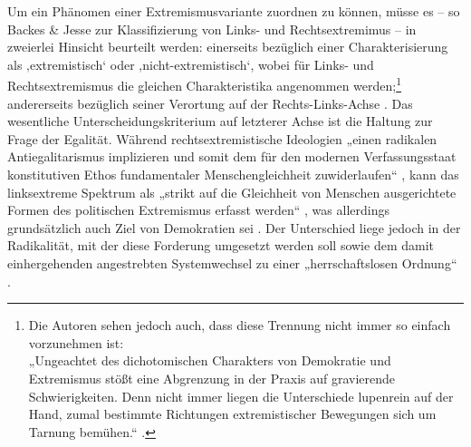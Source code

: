Um ein Phänomen einer Extremismusvariante zuordnen zu können, müsse es -- so Backes \& Jesse zur Klassifizierung von Links- und Rechtsextremimus -- in zweierlei Hinsicht beurteilt werden: einerseits bezüglich einer Charakterisierung als ‚extremistisch` oder ‚nicht-extremistisch`, wobei für Links- und Rechtsextremismus die gleichen Charakteristika angenommen werden;\footnote{Die Autoren sehen jedoch auch, dass diese Trennung nicht immer so einfach vorzunehmen ist:\\
  „Ungeachtet des dichotomischen Charakters von Demokratie und Extremismus stößt eine Abgrenzung in der Praxis auf gravierende Schwierigkeiten. Denn nicht immer liegen die Unterschiede lupenrein auf der Hand, zumal bestimmte Richtungen extremistischer Bewegungen sich um Tarnung bemühen.`` \autocite[46]{backesPolitischerExtremismusBundesrepublik1993}.} andererseits bezüglich seiner Verortung auf der Rechts-Links-Achse \autocite[51]{backesPolitischerExtremismusBundesrepublik1993}. Das wesentliche Unterscheidungskriterium auf letzterer Achse ist die Haltung zur Frage der Egalität. Während rechtsextremistische Ideologien „einen radikalen Antiegalitarismus implizieren und somit dem für den modernen Verfassungsstaat konstitutiven Ethos fundamentaler Menschengleichheit zuwiderlaufen`` \autocite[112]{backesExtremistischeIdeologien2018}, kann das linksextreme Spektrum als „strikt auf die Gleichheit von Menschen ausgerichtete Formen des politischen Extremismus erfasst werden`` \autocite[127]{backesExtremistischeIdeologien2018}, was allerdings grundsätzlich auch Ziel von Demokratien sei \autocite[53]{backesPolitischerExtremismusBundesrepublik1993}. Der Unterschied liege jedoch in der Radikalität, mit der diese Forderung umgesetzt werden soll sowie dem damit einhergehenden angestrebten Systemwechsel zu einer „herrschaftslosen Ordnung`` \autocite[53]{backesPolitischerExtremismusBundesrepublik1993}.

